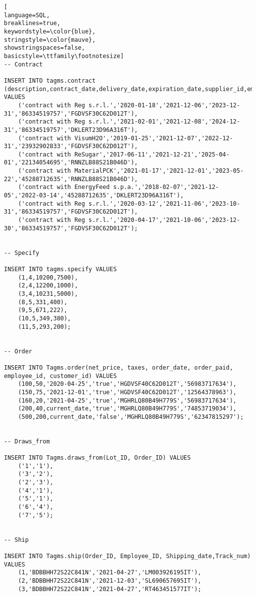 \begin{lstlisting}[
language=SQL,
breaklines=true,
keywordstyle=\color{blue},
stringstyle=\color{mauve},
showstringspaces=false,
basicstyle=\ttfamily\footnotesize]
-- Contract

INSERT INTO tagms.contract (description,contract_date,delivery_date,expiration_date,supplier_id,employee_id) VALUES
    ('contract with Reg s.r.l.','2020-01-18','2021-12-06','2023-12-31','86334519757','FGDVSF30C62D012T'),
    ('contract with Reg s.r.l.','2021-02-01','2021-12-08','2024-12-31','86334519757','DKLERT23D96A316T'),
    ('contract with VisumH2O','2019-01-25','2021-12-07','2022-12-31','23932902833','FGDVSF30C62D012T'),
    ('contract with ReSugar','2017-06-11','2021-12-21','2025-04-01','22134054695','RNNZLB88S21B046D'),
    ('contract with MaterialPCK','2021-01-17','2021-12-01','2023-05-22','45288712635','RNNZLB88S21B046D'),
    ('contract with EnergyFeed s.p.a.','2018-02-07','2021-12-05','2022-03-14','45288712635','DKLERT23D96A316T'),
    ('contract with Reg s.r.l.','2020-03-12','2021-11-06','2023-10-31','86334519757','FGDVSF30C62D012T'),
    ('contract with Reg s.r.l.','2020-04-17','2021-10-06','2023-12-30','86334519757','FGDVSF30C62D012T');


-- Specify

INSERT INTO tagms.specify VALUES
    (1,4,10200,7500),
    (2,4,12200,1000),
    (3,4,10231,5000),
    (8,5,331,400),
    (9,5,671,222),
    (10,5,349,380),
    (11,5,293,200);


-- Order

INSERT INTO Tagms.order(net_price, taxes, order_date, order_paid, employee_id, customer_id) VALUES
    (100,50,'2020-04-25','true','HGDVSF40C62D012T','56983717634'),
    (150,75,'2021-12-01','true','HGDVSF40C62D012T','12564378963'),
    (160,20,'2021-04-25','true','MGHRLQ80B49H779S','56983717634'),
    (200,40,current_date,'true','MGHRLQ80B49H779S','74853719034'),
    (500,200,current_date,'false','MGHRLQ80B49H779S','62347815297');


-- Draws_from

INSERT INTO Tagms.draws_from(Lot_ID, Order_ID) VALUES
    ('1','1'),
    ('3','2'),
    ('2','3'),
    ('4','1'),
    ('5','1'),
    ('6','4'),
    ('7','5');


-- Ship

INSERT INTO Tagms.ship(Order_ID, Employee_ID, Shipping_date,Track_num) VALUES
    (1,'BDBBHH72S22C841N','2021-04-27','LM003926195IT'),
    (2,'BDBBHH72S22C841N','2021-12-03','SL690657695IT'),
    (3,'BDBBHH72S22C841N','2021-04-27','RT463451577IT');






























\end{lstlisting}
